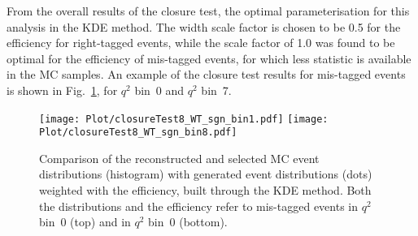 From the overall results of the closure test, the optimal parameterisation for this analysis in the KDE method. The width scale factor is chosen to be 0.5 for the efficiency for right-tagged events, while the scale factor of 1.0 was found to be optimal for the efficiency of mis-tagged events, for which less statistic is available in the MC samples.
An example of the closure test results for mis-tagged events is shown in Fig.~\ref{fig:clKDEmistag}, for $q^2$ bin~0 and $q^2$ bin~7.

\begin{figure}[hbt]
    \texttt{[image: Plot/closureTest8\_WT\_sgn\_bin1.pdf]}
    \texttt{[image: Plot/closureTest8\_WT\_sgn\_bin8.pdf]}
    \caption{Comparison of the reconstructed and selected MC event distributions (histogram) with generated event distributions (dots) weighted with the efficiency, built through the KDE method. Both the distributions and the efficiency refer to mis-tagged events in $q^2$ bin~0 (top) and in $q^2$ bin~0 (bottom).}
    \label{fig:clKDEmistag}
\end{figure}









